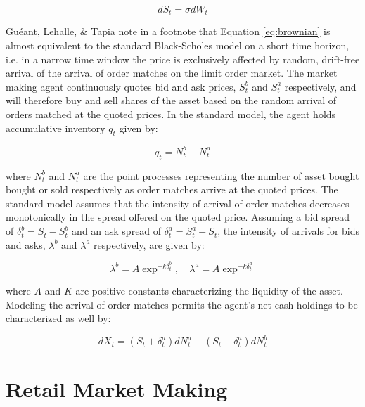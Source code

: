 \documentclass{article}
\begin{document}
\begin{equation}
\label{eq:brownian}
dS_{t} = \sigma dW_{t}
\end{equation}

Guéant, Lehalle, \& Tapia note in a footnote that Equation \ref{eq:brownian} is almost equivalent to the standard Black-Scholes model on a short time horizon, i.e. in a narrow time window the price is exclusively affected by random, drift-free arrival of the arrival of order matches on the limit order market. The market making agent continuously quotes bid and ask prices, $S^b_t$ and $S^a_t$ respectively, and will therefore buy and sell shares of the asset based on the random arrival of orders matched at the quoted prices. In the standard model, the agent holds accumulative inventory $q_t$ given by:

\begin{equation}
\label{eq:inventory}
q_{t} = N^b_{t} - N^a_{t}
\end{equation}

where $N^b_{t}$ and $N^a_{t}$ are the point processes representing the number of asset bought bought or sold respectively as order matches arrive at the quoted prices. The standard model assumes that the intensity of arrival of order matches decreases monotonically in the spread offered on the quoted price. Assuming a bid spread of $\delta^b_t = S_t - S^b_t$ and an ask spread of $\delta^a_t = S^a_t - S_t$, the intensity of arrivals for bids and asks, $\lambda^b$ and $\lambda^a$ respectively, are given by:

\begin{equation}
\label{eq:arrival}
\lambda^b = A \exp^{-k \delta^b_t}, \quad
\lambda^a = A \exp^{-k \delta^a_t}
\end{equation}

where $A$ and $K$ are positive constants characterizing the liquidity of the asset. Modeling the arrival of order matches permits the agent's net cash holdings to be characterized as well by:

\begin{equation}
\label{eq:cash}
dX_t = ( S_t + \delta^a_t ) dN^a_t - ( S_t - \delta^a_t ) dN^b_t
\end{equation}

\section{Retail Market Making}
\label{sec:retail}

\lipsum[1]
\lipsum[2]
\end{document}

